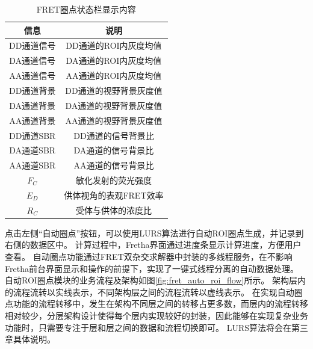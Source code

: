 \begin{table}[htbp]
  \centering
  \caption[FRET圈点状态栏显示内容]{FRET圈点状态栏显示内容}
  \label{tab:fret_statusbar_list}
      \begin{tabular}{cc}
      \toprule
      {信息} & {说明} \\
      \hline
      DD通道信号 & DD通道的ROI内灰度均值 \\
      DA通道信号 & DA通道的ROI内灰度均值 \\
      AA通道信号 & AA通道的ROI内灰度均值 \\
      DD通道背景 & DD通道的视野背景灰度值 \\
      DA通道背景 & DA通道的视野背景灰度值 \\
      AA通道背景 & AA通道的视野背景灰度值 \\
      DD通道SBR & DD通道的信号背景比 \\
      DA通道SBR & DA通道的信号背景比 \\
      AA通道SBR & AA通道的信号背景比 \\
      $F_C$ & 敏化发射的荧光强度 \\
      $E_D$ & 供体视角的表观FRET效率 \\
      $R_C$ & 受体与供体的浓度比 \\
      \bottomrule
    \end{tabular}
\end{table}
点击左侧“自动圈点”按钮，可以使用LURS算法进行自动ROI圈点生成，并记录到右侧的数据区中。
计算过程中，Fretha界面通过进度条显示计算进度，方便用户查看。
自动圈点功能通过FRET双杂交求解器中封装的多线程服务，在不影响Fretha前台界面显示和操作的前提下，实现了一键式线程分离的自动数据处理。
自动ROI圈点模块的业务流程及架构如图\ref{fig:fret_auto_roi_flow}所示。
架构层内的流程流转以实线表示，不同架构层之间的流程流转以虚线表示。
在实现自动圈点功能的流程转移中，发生在架构不同层之间的转移占更多数，而层内的流程转移相对较少，分层架构设计使得每个层内实现较好的封装，因此能够在实现复杂业务功能时，只需要专注于层和层之间的数据和流程切换即可。
LURS算法将会在第三章具体说明。

